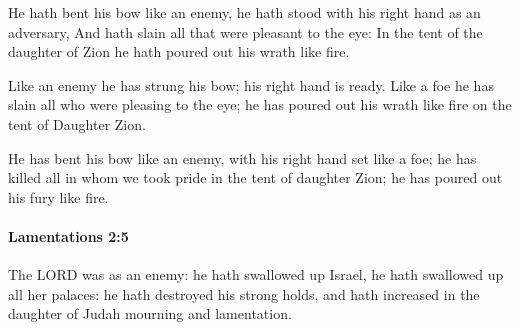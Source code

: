 			\begin{versebox}
					\item[BHS] 
					\item[LXX] 
					\item[ASV] He hath bent his bow like an enemy, he hath stood with his right hand as an adversary, And hath slain all that were pleasant to the eye: In the tent of the daughter of Zion he hath poured out his wrath like fire.
					\item[NIV] Like an enemy he has strung his bow; his right hand is ready. Like a foe he has slain all who were pleasing to the eye; he has poured out his wrath like fire on the tent of Daughter Zion.
					\item[NRSV] He has bent his bow like an enemy, with his right hand set like a foe; he has killed all in whom we took pride in the tent of daughter Zion; he has poured out his fury like fire.
			\end{versebox}

		\paragraph{Lamentations 2:5} %
			\label{LAMENTATIONS-2-5}

			The LORD was as an enemy: he hath swallowed up Israel, he hath swallowed up all her palaces: he hath destroyed his strong holds, and hath increased in the daughter of Judah mourning and lamentation.

